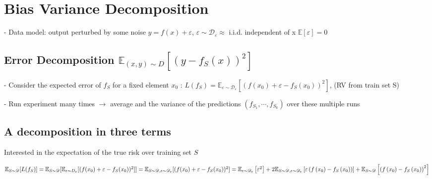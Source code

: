 \section{Bias Variance Decomposition}



- Data model: output perturbed by some noise
$y=f(x)+\varepsilon $,
$\varepsilon\sim\mathscr{D}_\varepsilon \approx$ i.i.d. independent of x $\mathbb{E}[\varepsilon]=0$


\subsection*{Error Decomposition $
\mathbb{E}_{(x, y) \sim D}\left[\left(y-f_{S}(x)\right)^{2}\right]
$}


- Consider the expected error of $f_{S}$ for a fixed element $x_{0}$ :
$
L\left(f_{S}\right)=\mathbb{E}_{\varepsilon \sim \mathscr{D}_{\varepsilon}}\left[\left(f\left(x_{0}\right)+\varepsilon-f_{S}\left(x_{0}\right)\right)^{2}\right]
$, 
(RV from train set S)


- Run experiment many times $\rightarrow$ average and the variance of the predictions $\left(f_{S_{1}}, \cdots, f_{S_{k}}\right)$ over these multiple runs

\subsection*{A decomposition in three terms}
Interested in the expectation of the true risk over training set $S$

$\mathbb{E}_{S \sim \mathscr{D}}[L(f_{S})] = \mathbb{E}_{S \sim \mathscr{D}}[\mathbb{E}_{\varepsilon \sim D_{\varepsilon}}[(f(x_{0})+\varepsilon-f_{S}(x_{0}))^{2}]] \\= \mathbb{E}_{S \sim \mathscr{D}, \varepsilon \sim \mathscr{D}_{\varepsilon}}[(f(x_{0})+\varepsilon-f_{S}(x_{0}))^{2}]=\mathbb{E}_{\varepsilon \sim \mathscr{D}_{\varepsilon}}\left[\varepsilon^{2}\right] +2 \mathbb{E}_{S \sim \mathscr{D}, \varepsilon \sim \mathscr{D}_{\varepsilon}}\left[\varepsilon\left(f\left(x_{0}\right)-f_{S}\left(x_{0}\right)\right)\right] +\mathbb{E}_{S \sim \mathscr{D}}\left[\left(f\left(x_{0}\right)-f_{S}\left(x_{0}\right)\right)^{2}\right]
$

